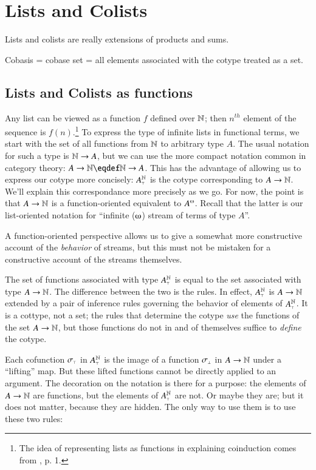 \chapter{Lists and Colists}

Lists and colists are really extensions of products and sums.

Cobasis = cobase set = all elements associated with the cotype treated
as a set.

\section{Lists and Colists as functions}

Any list can be viewed as a function \(f\) defined over \(\mathbb{N}\); then
\(n^{th}\) element of the sequence is \(f(n)\).\footnote{The idea of
representing lists as functions in explaining coinduction comes from
\cite{jacobs_intro_coalgebra}, p. 1.} To express the type of infinite
lists in functional terms, we start with the set of all functions from
\(\mathbb{N}\) to arbitrary type \(A\). The usual notation for such a type
is \(\mathbb{N}\rightarrow{}A\), but we can use the more compact notation common
in category theory: \(\morph{A}{\Nat}\defeq\Nat\rightarrow A\). This
has the advantage of allowing us to express our cotype more concisely:
\(A_{\scriptscriptstyle\top}^{\mathbb{N}}\) is the cotype corresponding to
\(A\rightarrow{}\mathbb{N}\). We'll explain this correspondance more precisely
as we go. For now, the point is that \(A\rightarrow{}\mathbb{N}\) is a
function-oriented equivalent to \(\colist{A}\). Recall that the latter
is our list-oriented notation for ``infinite (\(\omegaup\)) stream of
terms of type \(A\)''.

A function-oriented perspective allows us to give a somewhat more
constructive account of the \textit{behavior} of streams, but this
must not be mistaken for a constructive account of the streams
themselves.

The set of functions associated with type \(A_{\scriptscriptstyle\top}^{\mathbb{N}}\) is
equal to the set associated with type \(A\rightarrow{}\mathbb{N}\). The
difference between the two is the rules. In effect,
\(A_{\scriptscriptstyle\top}^{\mathbb{N}}\) is \(A\rightarrow{}\mathbb{N}\) extended by a pair of
inference rules governing the behavior of elements of
\(A_{\scriptscriptstyle\top}^{\mathbb{N}}\). It is a cottype, not a set; the rules that
determine the cotype \textit{use} the functions of the set
\(A\rightarrow{}\mathbb{N}\), but those functions do not in and of themselves
suffice to \textit{define} the cotype.

Each cofunction \(\sigma_{\scriptscriptstyle{\top}}\) in \(A_{\scriptscriptstyle\top}^{\mathbb{N}}\) is the image
of a function \(\sigma_{\scriptscriptstyle{\bot}}\) in \(A\rightarrow{}\mathbb{N}\) under a ``lifting''
map. But these lifted functions cannot be directly applied to an
argument. The decoration on the notation is there for a purpose: the
elements of \(A\rightarrow{}\mathbb{N}\) are functions, but the elements of
\(A_{\scriptscriptstyle\top}^{\mathbb{N}}\) are not. Or maybe they are; but it does not
matter, because they are hidden. The only way to use them is to use
these two rules:

